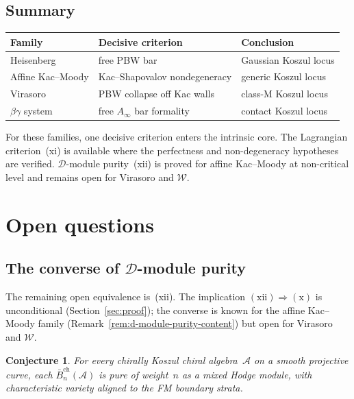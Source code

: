 \documentclass[11pt,reqno]{amsart}
\newtheorem{conjecture}[theorem]{Conjecture}
\theoremstyle{definition}
\theoremstyle{remark}
\newcommand{\cA}{\mathcal{A}}
\newcommand{\cD}{\mathcal{D}}
\newcommand{\cW}{\mathcal{W}}
\newcommand{\barBgeom}{\bar{B}^{\mathrm{ch}}}
\numberwithin{equation}{section}
\begin{document}
\subsection{Summary}

\begin{center}
\begin{tabular}{lll}
\toprule
Family & Decisive criterion & Conclusion \\
\midrule
Heisenberg & free PBW bar & Gaussian Koszul locus \\
Affine Kac--Moody & Kac--Shapovalov nondegeneracy & generic Koszul locus \\
Virasoro & PBW collapse off Kac walls & class-M Koszul locus \\
$\beta\gamma$ system & free $A_\infty$ bar formality & contact Koszul locus \\
\bottomrule
\end{tabular}
\end{center}

For these families, one decisive criterion enters the intrinsic
core. The Lagrangian criterion~\textup{(xi)} is available where
the perfectness and non-degeneracy hypotheses are verified.
$\cD$-module purity~\textup{(xii)} is proved for affine
Kac--Moody at non-critical level and remains open for Virasoro and
$\cW$.

\section{Open questions}
\label{sec:openquestions}

\subsection{The converse of $\cD$-module purity}

The remaining open equivalence is~(xii). The implication
$(\mathrm{xii})\Rightarrow(\mathrm{x})$ is unconditional
(Section~\ref{sec:proof}); the converse is known for the affine
Kac--Moody family (Remark~\ref{rem:d-module-purity-content}) but
open for Virasoro and $\cW$.

\begin{conjecture}
\label{conj:purity-converse}
For every chirally Koszul chiral algebra~$\cA$ on a smooth
projective curve, each $\barBgeom_n(\cA)$ is pure of weight~$n$
as a mixed Hodge module, with characteristic variety aligned to
the FM boundary strata.
\end{conjecture}
\end{document}
